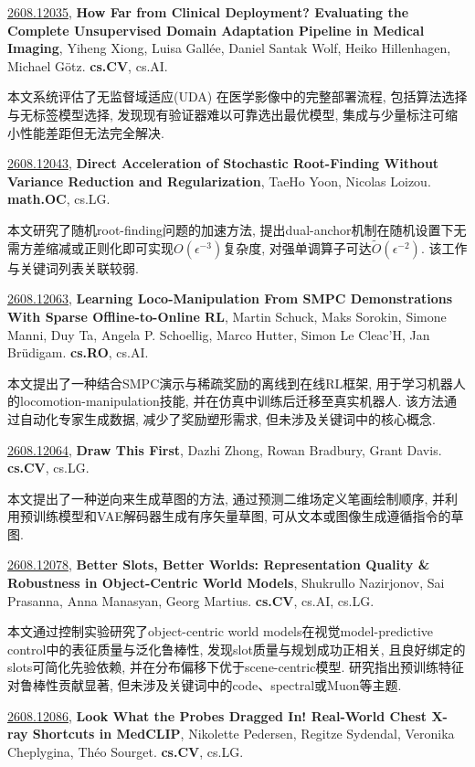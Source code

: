 \documentclass[9pt, a4paper]{article}
\theoremstyle{plain}
\theoremstyle{definition}
\theoremstyle{remark}
\newcommand{\arxivwithtarget}[3]{\hypertarget{#1}{}\href{https://arxiv.org/abs/#1}{#1}, \textbf{\textcolor{arxivblue}{#2}}, #3. }
\begin{document}
\arxivwithtarget{2608.12035}{How Far from Clinical Deployment? Evaluating the Complete Unsupervised Domain Adaptation Pipeline in Medical Imaging}{Yiheng Xiong, Luisa Gallée, Daniel Santak Wolf, Heiko Hillenhagen, Michael Götz}\textbf{cs.CV}, cs.AI.

本文系统评估了无监督域适应(UDA) 在医学影像中的完整部署流程, 包括算法选择与无标签模型选择, 发现现有验证器难以可靠选出最优模型, 集成与少量标注可缩小性能差距但无法完全解决.


\arxivwithtarget{2608.12043}{Direct Acceleration of Stochastic Root-Finding Without Variance Reduction and Regularization}{TaeHo Yoon, Nicolas Loizou}\textbf{math.OC}, cs.LG.

本文研究了随机root-finding问题的加速方法, 提出dual-anchor机制在随机设置下无需方差缩减或正则化即可实现$O(\epsilon^{-3})$复杂度, 对强单调算子可达$\widetilde{O}(\epsilon^{-2})$. 该工作与关键词列表关联较弱.


\arxivwithtarget{2608.12063}{Learning Loco-Manipulation From SMPC Demonstrations With Sparse Offline-to-Online RL}{Martin Schuck, Maks Sorokin, Simone Manni, Duy Ta, Angela P. Schoellig, Marco Hutter, Simon Le Cleac'H, Jan Brüdigam}\textbf{cs.RO}, cs.AI.

本文提出了一种结合SMPC演示与稀疏奖励的离线到在线RL框架, 用于学习机器人的locomotion-manipulation技能, 并在仿真中训练后迁移至真实机器人. 该方法通过自动化专家生成数据, 减少了奖励塑形需求, 但未涉及关键词中的核心概念.


\arxivwithtarget{2608.12064}{Draw This First}{Dazhi Zhong, Rowan Bradbury, Grant Davis}\textbf{cs.CV}, cs.LG.

本文提出了一种逆向来生成草图的方法, 通过预测二维场定义笔画绘制顺序, 并利用预训练模型和VAE解码器生成有序矢量草图, 可从文本或图像生成遵循指令的草图.


\arxivwithtarget{2608.12078}{Better Slots, Better Worlds: Representation Quality & Robustness in Object-Centric World Models}{Shukrullo Nazirjonov, Sai Prasanna, Anna Manasyan, Georg Martius}\textbf{cs.CV}, cs.AI, cs.LG.

本文通过控制实验研究了object-centric world models在视觉model-predictive control中的表征质量与泛化鲁棒性, 发现slot质量与规划成功正相关, 且良好绑定的slots可简化先验依赖, 并在分布偏移下优于scene-centric模型. 研究指出预训练特征对鲁棒性贡献显著, 但未涉及关键词中的code、spectral或Muon等主题.


\arxivwithtarget{2608.12086}{Look What the Probes Dragged In! Real-World Chest X-ray Shortcuts in MedCLIP}{Nikolette Pedersen, Regitze Sydendal, Veronika Cheplygina, Théo Sourget}\textbf{cs.CV}, cs.LG.
\end{document}
